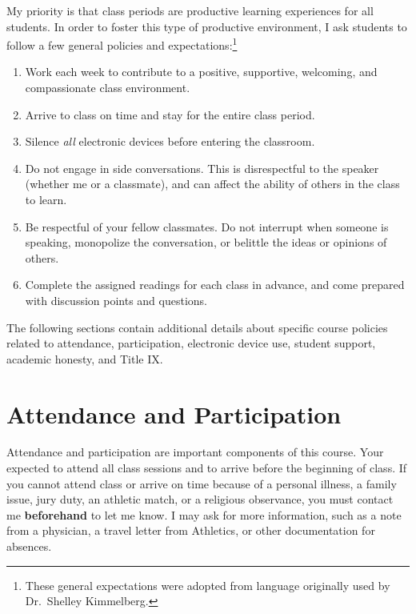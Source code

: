 \documentclass[]{book}
\providecommand{\tightlist}{%
  \setlength{\itemsep}{0pt}\setlength{\parskip}{0pt}}
\let\rmarkdownfootnote\footnote%
\def\footnote{\protect\rmarkdownfootnote}
\theoremstyle{definition}
\theoremstyle{definition}
\theoremstyle{definition}
\theoremstyle{remark}
\begin{document}
My priority is that class periods are productive learning experiences
for all students. In order to foster this type of productive
environment, I ask students to follow a few general policies and
expectations:\footnote{These general expectations were adopted from
  language originally used by Dr.~Shelley Kimmelberg.}

\begin{enumerate}
\def\labelenumi{\arabic{enumi}.}
\tightlist
\item
  Work each week to contribute to a positive, supportive, welcoming, and
  compassionate class environment.
\item
  Arrive to class on time and stay for the entire class period.
\item
  Silence \emph{all} electronic devices before entering the classroom.
\item
  Do not engage in side conversations. This is disrespectful to the
  speaker (whether me or a classmate), and can affect the ability of
  others in the class to learn.
\item
  Be respectful of your fellow classmates. Do not interrupt when someone
  is speaking, monopolize the conversation, or belittle the ideas or
  opinions of others.
\item
  Complete the assigned readings for each class in advance, and come
  prepared with discussion points and questions.
\end{enumerate}

The following sections contain additional details about specific course
policies related to attendance, participation, electronic device use,
student support, academic honesty, and Title IX.

\hypertarget{attendance-and-participation}{%
\section{Attendance and
Participation}\label{attendance-and-participation}}

Attendance and participation are important components of this course.
Your expected to attend all class sessions and to arrive before the
beginning of class. If you cannot attend class or arrive on time because
of a personal illness, a family issue, jury duty, an athletic match, or
a religious observance, you must contact me \textbf{beforehand} to let
me know. I may ask for more information, such as a note from a
physician, a travel letter from Athletics, or other documentation for
absences.
\end{document}
